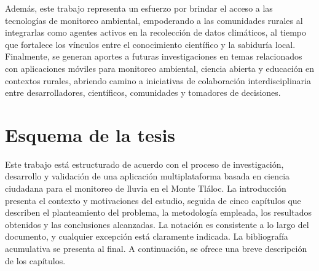 Además, este trabajo representa un esfuerzo por brindar el acceso a las tecnologías de monitoreo ambiental, empoderando a las comunidades rurales al integrarlas como agentes activos en la recolección de datos climáticos, al tiempo que fortalece los vínculos entre el conocimiento científico y la sabiduría local. Finalmente, se generan aportes a futuras investigaciones en temas relacionados con aplicaciones móviles para monitoreo ambiental, ciencia abierta y educación en contextos rurales, abriendo camino a iniciativas de colaboración interdisciplinaria entre desarrolladores, científicos, comunidades y tomadores de decisiones.


\section{Esquema de la tesis}

Este trabajo está estructurado de acuerdo con el proceso de investigación, desarrollo y validación de una aplicación multiplataforma basada en ciencia ciudadana para el monitoreo de lluvia en el Monte Tláloc. La introducción presenta el contexto y motivaciones del estudio, seguida de cinco capítulos que describen el planteamiento del problema, la metodología empleada, los resultados obtenidos y las conclusiones alcanzadas. La notación es consistente a lo largo del documento, y cualquier excepción está claramente indicada. La bibliografía acumulativa se presenta al final. A continuación, se ofrece una breve descripción de los capítulos.

